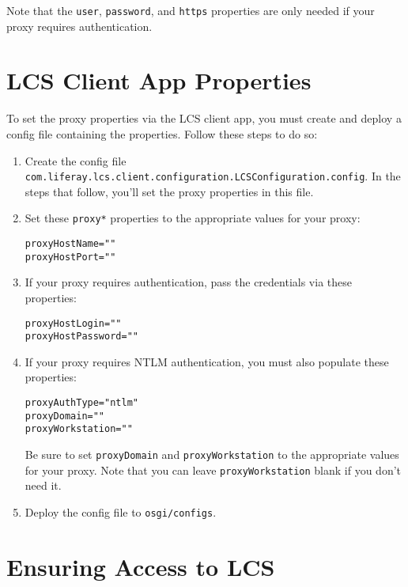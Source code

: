 Note that the \texttt{user}, \texttt{password}, and \texttt{https}
properties are only needed if your proxy requires authentication.

\section{LCS Client App Properties}\label{lcs-client-app-properties}

To set the proxy properties via the LCS client app, you must create and
deploy a config file containing the properties. Follow these steps to do
so:

\begin{enumerate}
\def\labelenumi{\arabic{enumi}.}
\item
  Create the config file
  \texttt{com.liferay.lcs.client.configuration.LCSConfiguration.config}.
  In the steps that follow, you'll set the proxy properties in this
  file.
\item
  Set these \texttt{proxy*} properties to the appropriate values for
  your proxy:

\begin{verbatim}
proxyHostName=""
proxyHostPort=""
\end{verbatim}
\item
  If your proxy requires authentication, pass the credentials via these
  properties:

\begin{verbatim}
proxyHostLogin=""
proxyHostPassword=""
\end{verbatim}
\item
  If your proxy requires NTLM authentication, you must also populate
  these properties:

\begin{verbatim}
proxyAuthType="ntlm"
proxyDomain=""
proxyWorkstation=""
\end{verbatim}

  Be sure to set \texttt{proxyDomain} and \texttt{proxyWorkstation} to
  the appropriate values for your proxy. Note that you can leave
  \texttt{proxyWorkstation} blank if you don't need it.
\item
  Deploy the config file to \texttt{osgi/configs}.
\end{enumerate}

\section{Ensuring Access to LCS}\label{ensuring-access-to-lcs}

